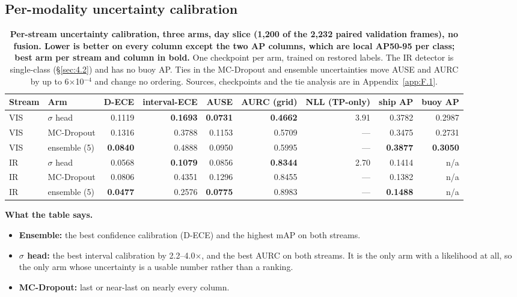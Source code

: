 \documentclass[10pt]{article}
\begin{document}
\subsection{Per-modality uncertainty calibration}\label{sec:6.2}
\begin{table}[htbp]
\centering
\footnotesize
\caption{\textbf{Per-stream uncertainty calibration, three arms, day slice (1,200 of the 2,232 paired validation frames), no fusion. Lower is better on every column except the two AP columns, which are local AP50-95 per class; best arm per stream and column in bold.} One checkpoint per arm, trained on restored labels. The IR detector is single-class (\S\ref{sec:4.2}) and has no buoy AP. Ties in the MC-Dropout and ensemble uncertainties move AUSE and AURC by up to 6$\times$10$^{-4}$ and change no ordering. Sources, checkpoints and the tie analysis are in Appendix~\ref{app:F.1}.}
\label{tab:2}
\setlength{\tabcolsep}{3pt}
\begin{adjustbox}{max width=\linewidth}
\begin{tabular}{llrrrrrrr}
\toprule
Stream & Arm & D-ECE & interval-ECE & AUSE & AURC (grid) & NLL (TP-only) & ship AP & buoy AP \\
\midrule
VIS & $\sigma$ head & 0.1119 & \textbf{0.1693} & \textbf{0.0731} & \textbf{0.4662} & 3.91 & 0.3782 & 0.2987 \\
VIS & MC-Dropout & 0.1316 & 0.3788 & 0.1153 & 0.5709 & --- & 0.3475 & 0.2731 \\
VIS & ensemble (5) & \textbf{0.0840} & 0.4888 & 0.0950 & 0.5995 & --- & \textbf{0.3877} & \textbf{0.3050} \\
IR & $\sigma$ head & 0.0568 & \textbf{0.1079} & 0.0856 & \textbf{0.8344} & 2.70 & 0.1414 & n/a \\
IR & MC-Dropout & 0.0806 & 0.4351 & 0.1296 & 0.8455 & --- & 0.1382 & n/a \\
IR & ensemble (5) & \textbf{0.0477} & 0.2576 & \textbf{0.0775} & 0.8983 & --- & \textbf{0.1488} & n/a \\
\bottomrule
\end{tabular}
\end{adjustbox}
\end{table}
\textbf{What the table says.}
\begin{itemize}
\item \textbf{Ensemble:} the best confidence calibration (D-ECE) and the highest mAP on both streams.
\item \textbf{$\sigma$ head:} the best interval calibration by 2.2--4.0$\times$, and the best AURC on both streams. It is the only arm with a likelihood at all, so the only arm whose uncertainty is a usable number rather than a ranking.
\item \textbf{MC-Dropout:} last or near-last on nearly every column.
\end{itemize}
\end{document}
